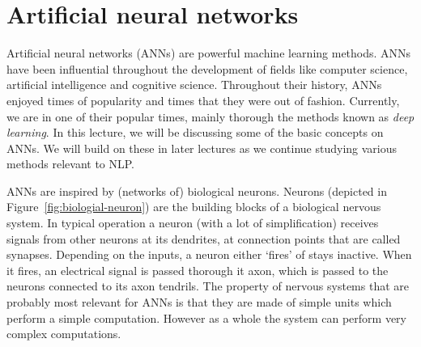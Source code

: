 \chapter{\label{chap:neural}Artificial neural networks}


Artificial neural networks (ANNs) are powerful machine learning methods. 
ANNs have been influential throughout the 
development of fields like computer science,
artificial intelligence and cognitive science.
Throughout their history,
ANNs enjoyed times of popularity and times that they were out of fashion.
Currently,
we are in one of their popular times,
mainly thorough the methods known as \emph{deep learning}.%
In this lecture,
we will be discussing some of the basic concepts on ANNs.
We will build on these in later lectures
as we continue studying various methods relevant to NLP.


\begin{marginfigure}
  \centering
  \caption{\label{fig:biologial-neuron}%
    A schematic drawing of a biological neuron
    (image source: \href{https://en.wikipedia.org/wiki/Neuron}{Wikipedia}).
  }
\end{marginfigure}
ANNs are inspired by (networks of) biological neurons.
Neurons (depicted in Figure~\ref{fig:biologial-neuron}) 
are the building blocks of a biological nervous system.
In typical operation a neuron (with a lot of simplification) receives 
signals from other neurons at its dendrites,
at connection points that are called synapses.
Depending on the inputs, a neuron either `fires' of stays inactive.
When it fires,
an electrical signal is passed thorough it axon,
which is passed to the neurons connected to its axon tendrils.
The property of nervous systems that are probably most relevant for ANNs
is that they are made of simple units which perform a simple computation.
However as a whole the system can perform very complex computations.

